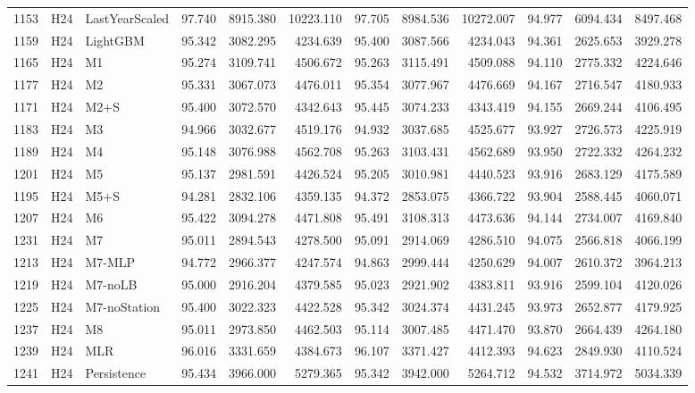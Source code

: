 \begin{tabular}{lllrrrrrrrrr}
1153 & H24 & LastYearScaled & 97.740 & 8915.380 & 10223.110 & 97.705 & 8984.536 & 10272.007 & 94.977 & 6094.434 & 8497.468 \\
1159 & H24 & LightGBM & 95.342 & 3082.295 & 4234.639 & 95.400 & 3087.566 & 4234.043 & 94.361 & 2625.653 & 3929.278 \\
1165 & H24 & M1 & 95.274 & 3109.741 & 4506.672 & 95.263 & 3115.491 & 4509.088 & 94.110 & 2775.332 & 4224.646 \\
1177 & H24 & M2 & 95.331 & 3067.073 & 4476.011 & 95.354 & 3077.967 & 4476.669 & 94.167 & 2716.547 & 4180.933 \\
1171 & H24 & M2+S & 95.400 & 3072.570 & 4342.643 & 95.445 & 3074.233 & 4343.419 & 94.155 & 2669.244 & 4106.495 \\
1183 & H24 & M3 & 94.966 & 3032.677 & 4519.176 & 94.932 & 3037.685 & 4525.677 & 93.927 & 2726.573 & 4225.919 \\
1189 & H24 & M4 & 95.148 & 3076.988 & 4562.708 & 95.263 & 3103.431 & 4562.689 & 93.950 & 2722.332 & 4264.232 \\
1201 & H24 & M5 & 95.137 & 2981.591 & 4426.524 & 95.205 & 3010.981 & 4440.523 & 93.916 & 2683.129 & 4175.589 \\
1195 & H24 & M5+S & 94.281 & 2832.106 & 4359.135 & 94.372 & 2853.075 & 4366.722 & 93.904 & 2588.445 & 4060.071 \\
1207 & H24 & M6 & 95.422 & 3094.278 & 4471.808 & 95.491 & 3108.313 & 4473.636 & 94.144 & 2734.007 & 4169.840 \\
1231 & H24 & M7 & 95.011 & 2894.543 & 4278.500 & 95.091 & 2914.069 & 4286.510 & 94.075 & 2566.818 & 4066.199 \\
1213 & H24 & M7-MLP & 94.772 & 2966.377 & 4247.574 & 94.863 & 2999.444 & 4250.629 & 94.007 & 2610.372 & 3964.213 \\
1219 & H24 & M7-noLB & 95.000 & 2916.204 & 4379.585 & 95.023 & 2921.902 & 4383.811 & 93.916 & 2599.104 & 4120.026 \\
1225 & H24 & M7-noStation & 95.400 & 3022.323 & 4422.528 & 95.342 & 3024.374 & 4431.245 & 93.973 & 2652.877 & 4179.925 \\
1237 & H24 & M8 & 95.011 & 2973.850 & 4462.503 & 95.114 & 3007.485 & 4471.470 & 93.870 & 2664.439 & 4264.180 \\
1239 & H24 & MLR & 96.016 & 3331.659 & 4384.673 & 96.107 & 3371.427 & 4412.393 & 94.623 & 2849.930 & 4110.524 \\
1241 & H24 & Persistence & 95.434 & 3966.000 & 5279.365 & 95.342 & 3942.000 & 5264.712 & 94.532 & 3714.972 & 5034.339 \\

\end{tabular}

